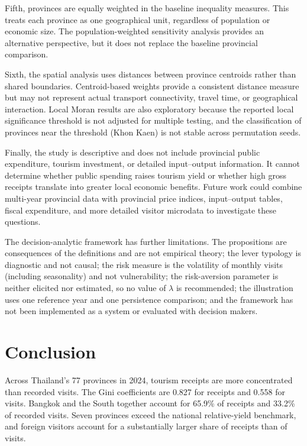 \documentclass[11pt,a4paper]{article}
\theoremstyle{plain}\newtheorem{proposition}{Proposition}
\theoremstyle{definition}\newtheorem{definition}{Definition}
\begin{document}
Fifth, provinces are equally weighted in the baseline inequality measures. This treats each province as one geographical unit, regardless of population or economic size. The population-weighted sensitivity analysis provides an alternative perspective, but it does not replace the baseline provincial comparison.

Sixth, the spatial analysis uses distances between province centroids rather than shared boundaries. Centroid-based weights provide a consistent distance measure but may not represent actual transport connectivity, travel time, or geographical interaction. Local Moran results are also exploratory because the reported local significance threshold is not adjusted for multiple testing, and the classification of provinces near the threshold (Khon Kaen) is not stable across permutation seeds.

Finally, the study is descriptive and does not include provincial public expenditure, tourism investment, or detailed input--output information. It cannot determine whether public spending raises tourism yield or whether high gross receipts translate into greater local economic benefits. Future work could combine multi-year provincial data with provincial price indices, input--output tables, fiscal expenditure, and more detailed visitor microdata to investigate these questions.

The decision-analytic framework has further limitations. The propositions are consequences of the definitions and are not empirical theory; the lever typology is diagnostic and not causal; the risk measure is the volatility of monthly visits (including seasonality) and not vulnerability; the risk-aversion parameter is neither elicited nor estimated, so no value of $\lambda$ is recommended; the illustration uses one reference year and one persistence comparison; and the framework has not been implemented as a system or evaluated with decision makers.

\section{Conclusion}
Across Thailand's 77 provinces in 2024, tourism receipts are more concentrated than recorded visits. The Gini coefficients are 0.827 for receipts and 0.558 for visits. Bangkok and the South together account for 65.9\% of receipts and 33.2\% of recorded visits. Seven provinces exceed the national relative-yield benchmark, and foreign visitors account for a substantially larger share of receipts than of visits.
\end{document}
